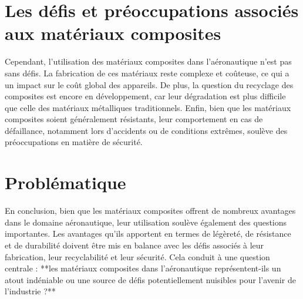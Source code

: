 \section{Les défis et préoccupations associés aux matériaux composites}

Cependant, l'utilisation des matériaux composites dans l'aéronautique n'est pas sans défis. La fabrication de ces matériaux reste complexe et coûteuse, ce qui a un impact sur le coût global des appareils. De plus, la question du recyclage des composites est encore en développement, car leur dégradation est plus difficile que celle des matériaux métalliques traditionnels. Enfin, bien que les matériaux composites soient généralement résistants, leur comportement en cas de défaillance, notamment lors d'accidents ou de conditions extrêmes, soulève des préoccupations en matière de sécurité.


\section{Problématique}

En conclusion, bien que les matériaux composites offrent de nombreux avantages dans le domaine aéronautique, leur utilisation soulève également des questions importantes. Les avantages qu'ils apportent en termes de légèreté, de résistance et de durabilité doivent être mis en balance avec les défis associés à leur fabrication, leur recyclabilité et leur sécurité. Cela conduit à une question centrale : **les matériaux composites dans l'aéronautique représentent-ils un atout indéniable ou une source de défis potentiellement nuisibles pour l'avenir de l'industrie ?**












